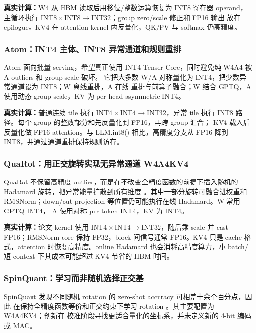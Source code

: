 \textbf{真实计算：}W4 从 HBM 读取后用移位/整数运算恢复为 INT8 寄存器 operand，
主循环执行 $\mathrm{INT8}\times\mathrm{INT8}\rightarrow\mathrm{INT32}$；group zero/scale 修正和 FP16 输出
放在 epilogue。KV4 在 attention kernel 内反量化，QK/PV 与 softmax 仍高精度。

\subsubsection{Atom：INT4 主体、INT8 异常通道和规则重排}

Atom 面向批量 serving，希望真正使用 INT4 Tensor Core，同时避免纯 W4A4 被 A
outliers 和 group scale 破坏。
它把大多数 W/A 对称量化为 INT4，把少数异常通道设为 INT8；W 离线重排，A 在线
重排与前算子融合；W 结合 GPTQ，A 使用动态 group scale，KV 为 per-head asymmetric
INT4。

\textbf{真实计算：}普通连续 tile 执行 $\mathrm{INT4}\times\mathrm{INT4}\rightarrow\mathrm{INT32}$，异常
tile 执行 INT8 路径。每个 group 的整数部分和先反量化到 FP16，再跨 group 汇合；
KV4 载入后反量化做 FP16 attention。与 LLM.int8() 相比，高精度分支从 FP16 降到
INT8，并通过通道重排保持规则访存。

\subsubsection{QuaRot：用正交旋转实现无异常通道 W4A4KV4}

QuaRot 不保留高精度 outlier，而是在不改变全精度函数的前提下插入随机的
Hadamard 旋转，把异常能量扩散到所有维度
。其中一部分旋转可融合进权重和
RMSNorm；down/out projection 等位置仍可能执行在线 Hadamard。W 常用 GPTQ INT4，
A 使用对称 per-token INT4，KV 为 INT4。

\textbf{真实计算：}论文 kernel 使用 $\mathrm{INT4}\times\mathrm{INT4}\rightarrow\mathrm{INT32}$，随后乘
scale 并 cast FP16；RMSNorm core 保持 FP32，block 间信号通常 FP16。KV4 只是 cache
格式，attention 时恢复高精度。online Hadamard 也会消耗高精度算力，小 batch/短
context 下其成本可能超过 KV4 节省的 HBM 时间。

\subsubsection{SpinQuant：学习而非随机选择正交基}

SpinQuant 发现不同随机 rotation 的 zero-shot accuracy 可相差十余个百分点，因此
在保持全精度函数等价和正交约束下学习 rotation
。其主要配置为 W4A4KV4；创新在
校准阶段寻找更适合量化的坐标系，并未定义新的 4-bit 编码或 MAC。

